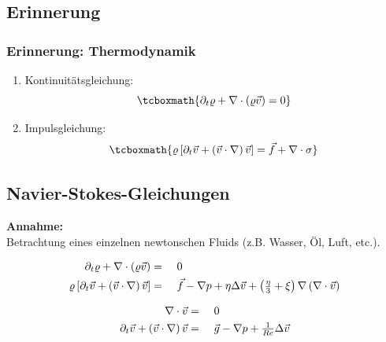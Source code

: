		\subsection{Erinnerung} %
		\label{sub:erinnerung}
		
			\begin{frame}
				\frametitle{Erinnerung: Thermodynamik}
				\begin{enumerate}[label=(\roman*)]
					\item Kontinuitätsgleichung:
						\[ \tcboxmath{\partial_t\varrho + \nabla\cdot\curvb{ \varrho\vec{v} } = 0} \]
					\item Impulsgleichung:
						\[ \tcboxmath{\varrho \boxb{ \partial_t \vec{v} + \curvb{ \vec{v}\cdot\nabla }\vec{v} } = \vec{f} + \nabla\cdot\sigma} \]
				\end{enumerate}
			\end{frame}
		


		\subsection{Navier-Stokes-Gleichungen} %
		\label{sub:navier_stokes_gleichungen}
		
			\begin{frame}
				\textbf{Annahme:}\\
				Betrachtung eines einzelnen newtonschen Fluids (z.B. Wasser, Öl, Luft, etc.).
				\vfill
				\pause
				\begin{tcolorbox}[title = Navier-Stokes Gleichungen]
					\begin{alignat*}{3}
						\partial_t\varrho + \nabla\cdot\left(  \varrho\vec{v}  \right) &=&& \ 0 \\
						\varrho \left[  \partial_t \vec{v} + \left(  \vec{v}\cdot\nabla  \right)\vec{v}  \right] &=&& \ \vec{f} - \nabla p + \eta\Delta\vec{v} + \left(  \tfrac{\eta}{3}+\xi  \right)\nabla\left(  \nabla\cdot\vec{v}  \right)
					\end{alignat*}
				\end{tcolorbox}
			\end{frame}

			\begin{frame}[label=nsg]
				\begin{tcolorbox}[title = dimensionslose Navier-Stokes Gleichungen inkompressibler Flüssigkeiten]
					\begin{alignat*}{3}
						\nabla\cdot\vec{v} &=&& \ 0 \\
						\partial_t \vec{v} + \left(  \vec{v}\cdot\nabla  \right)\vec{v} &=&& \ \vec{g} - \nabla p + \tfrac{1}{Re}\Delta\vec{v}
					\end{alignat*}
				\end{tcolorbox}
			\end{frame}
		
